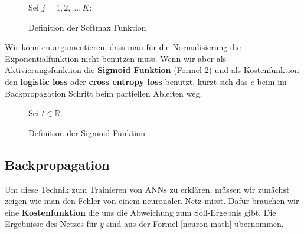             \begin{figure}[H]
                \begin{mdframed}
                    Sei $j = 1,2,...,K$: \\
                    \hspace*{45mm} 
                \end{mdframed}
\formforfigure
                \caption{\label{softmax} Definition der Softmax Funktion \cite{softmax-lit}}
            \end{figure}

            \noindent
            Wir könnten argumentieren, dass man für die Normalisierung die Exponentialfunktion nicht benutzen muss. Wenn wir aber als Aktivierungsfunktion die \textbf{Sigmoid Funktion} (Formel \ref{sigmoid}) und als Kostenfunktion den \textbf{logistic loss} oder \textbf{cross entropy loss} benutzt, kürzt sich das $e$ beim im Backpropagation Schritt beim partiellen Ableiten weg.

            \begin{figure}[H]
                \begin{mdframed}
                    Sei $t \in \mathbb{R}$:\\
                    \hspace*{50mm} 
                \end{mdframed}
\formforfigure
                \caption{\label{sigmoid} Definition der Sigmoid Funktion}
            \end{figure}


            \subsection{Backpropagation} \label{backprop-chapter}
                Um diese Technik zum Trainieren von ANNs zu erklären, müssen wir zunächst zeigen wie man den Fehler von einem neuronalen Netz misst. Dafür brauchen wir eine \textbf{Kostenfunktion} die uns die Abweichung zum Soll-Ergebnis gibt. Die Ergebnisse des Netzes für $\widehat{y}$ sind aus der Formel \ref{neuron-math} übernommen.

